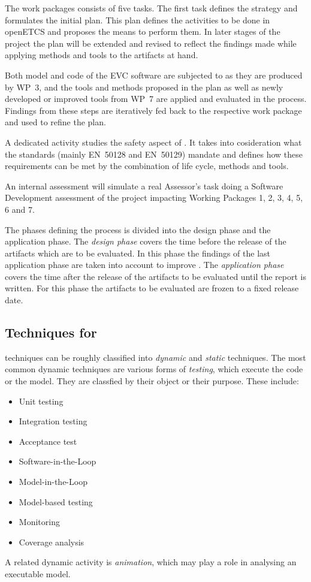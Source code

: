 The work packages consists of five tasks. The first task defines the
\vv strategy and formulates the initial \vv plan. This plan defines the
\vv activities to be done in openETCS and proposes the means to
perform them. In later stages of the project the plan will be extended
and revised to reflect the findings made while applying methods and
tools to the artifacts at hand.

Both model and code of the EVC software are subjected to \vv as they
are produced by WP~3, and the tools and methods proposed in the \vv
plan as well as newly developed or improved tools from WP~7 are applied
and evaluated in the process. Findings from these steps are
iteratively fed back to the respective work package and used to refine
the \vv plan.

A dedicated activity studies the safety aspect of \vv. It takes into
cosideration what the standards (mainly EN~50128 and EN~50129) mandate
and defines how these requirements can be met by the combination of
life cycle, methods and tools.

An internal assessment will simulate a real Assessor's task doing a 
Software Development assessment of the project impacting Working Packages 
1, 2, 3, 4, 5, 6 and 7.

The phases defining the \vv process is divided into the design phase and 
the application phase. The \emph{design phase} covers the time before the 
release of the artifacts which are to be evaluated. In this phase the 
findings of the last application phase are taken into account to improve 
\vv.
The \emph{application phase} covers the time after the release of the 
artifacts to be evaluated until the \vv report is written. For this phase 
the artifacts to be evaluated are frozen to a fixed release date.  

\subsection*{Techniques for \VV}

\VV techniques can be roughly classified into \emph{dynamic} and
\emph{static} techniques.  The most common dynamic \vv techniques are
various forms of \emph{testing}, which execute the code or the
model. They are classfied by their object or their purpose. These
include:
\begin{itemize}
\item Unit testing
\item Integration testing
\item Acceptance test
\item Software-in-the-Loop
\item Model-in-the-Loop
\item Model-based testing
\item Monitoring
\item Coverage analysis
\end{itemize}
A related dynamic activity is \emph{animation}, which may play a role
in analysing an executable model.

